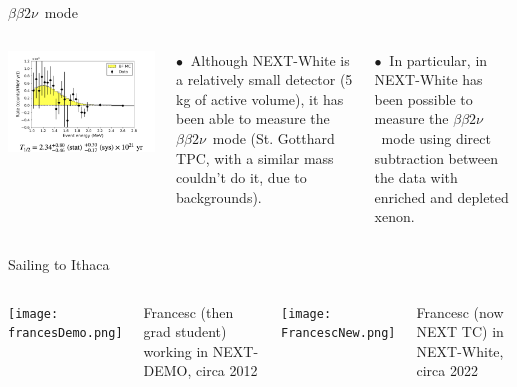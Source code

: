 \documentclass [aspectratio=169]{beamer}
\newcommand{\bbtnu}{\ensuremath{\beta\beta2\nu}}
\begin{document}
\begin{frame}{\bbtnu\ mode}
\begin{columns}
\includegraphics[scale=0.36]{bb2nu.png}

$\bullet~$ Although NEXT-White is a relatively small detector (5 kg of active volume), it has been able to measure the \bbtnu\ mode (St. Gotthard TPC, with a similar mass couldn't do it, due to backgrounds). 

$\bullet~$ In particular, in NEXT-White has been possible to measure the \bbtnu\ mode using direct subtraction between the data with enriched and depleted xenon. 
 \end{columns}
\end{frame}

\begin{frame}{Sailing to Ithaca}
\begin{columns}
\texttt{[image: francesDemo.png]}

Francesc (then grad student) working in NEXT-DEMO, circa 2012

\texttt{[image: FrancescNew.png]}

Francesc (now NEXT TC) in NEXT-White, circa 2022
 
 \end{columns}
\end{frame}









\end{document}
